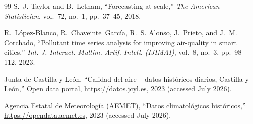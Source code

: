 \documentclass[a4paper,fleqn]{cas-dc}
\begin{document}
\begin{thebibliography}{99}
S.~J. Taylor and B.~Letham,
``Forecasting at scale,''
\emph{The American Statistician}, vol.~72, no.~1, pp.~37--45, 2018.

R.~L\'opez-Blanco, R.~Chaveinte~Garc\'ia, R.~S. Alonso, J.~Prieto, and J.~M. Corchado,
``Pollutant time series analysis for improving air-quality in smart cities,''
\emph{Int. J. Interact. Multim. Artif. Intell. (IJIMAI)}, vol.~8, no.~3, pp.~98--112, 2023.

Junta de Castilla y Le\'on,
``Calidad del aire -- datos hist\'oricos diarios, Castilla y Le\'on,''
Open data portal, \url{https://datos.jcyl.es}, 2023 (accessed July 2026).

Agencia Estatal de Meteorolog\'ia (AEMET),
``Datos climatol\'ogicos hist\'oricos,''
\url{https://opendata.aemet.es}, 2023 (accessed July 2026).

\end{thebibliography}
\end{document}
